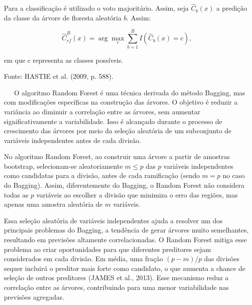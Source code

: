 \documentclass[
  12pt,
  a4paper,
]{scrreprt}
\begin{document}
\begin{algo}
{\begin{algorithm}[H]
\begin{algorithmic}
\vspace{1em}

\State \hspace{0.7em} Para a classificação é utilizado o voto majoritário. Assim, seja $\hat{C}_{b}\left(x\right)$ a predição da classe da árvore de floresta aleatória $b$. Assim:

$$
\hat{C}^{B}_{rf}\left(x\right) = \arg \max_c \sum^{B}_{b = 1}I\left(\hat{C}_b\left(x\right) = c\right)\text{,}
$$

\State em que $c$ representa as classes possíveis.

\end{algorithmic}
\end{algorithm}

}

\caption{\label{algo-rf}Fonte: HASTIE et al. (2009, p. 588).}

\end{algo}%

~~~O algoritmo Random Forest é uma técnica derivada do método Bagging,
mas com modificações específicas na construção das árvores. O objetivo é
reduzir a variância ao diminuir a correlação entre as árvores, sem
aumentar significativamente a variabilidade. Isso é alcançado durante o
processo de crescimento das árvores por meio da seleção aleatória de um
subconjunto de variáveis independentes antes de cada divisão.

\vspace{12pt}

No algoritmo Random Forest, ao construir uma árvore a partir de amostras
bootstrap, selecionam-se aleatoriamente \(m \leq p\) das \(p\) variáveis
independentes como candidatas para a divisão, antes de cada ramificação
(sendo \(m = p\) no caso do Bagging). Assim, diferentemente do Bagging,
o Random Forest não considera todas as \(p\) variáveis ao escolher a
divisão que minimiza o erro das regiões, mas apenas uma amostra
aleatória de \(m\) variáveis.

\vspace{12pt}

Essa seleção aleatória de variáveis independentes ajuda a resolver um
dos principais problemas do Bagging, a tendência de gerar árvores muito
semelhantes, resultando em previsões altamente correlacionadas. O Random
Forest mitiga esse problema ao criar oportunidades para que diferentes
preditores sejam considerados em cada divisão. Em média, uma fração
\((p - m)/p\) das divisões sequer incluirá o preditor mais forte como
candidato, o que aumenta a chance de seleção de outros preditores (JAMES
et al., 2013). Esse mecanismo reduz a correlação entre as árvores,
contribuindo para uma menor variabilidade nas previsões agregadas.
\end{document}
